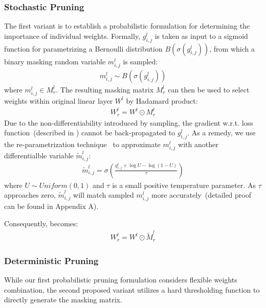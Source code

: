 \subsubsection{Stochastic Pruning}
\label{sec:stochastic}
The first variant is to establish a probabilistic formulation for determining the importance of individual weights. Formally, $g_{i,j}^l$ is taken as input to a sigmoid function for parametrizing a Bernoulli distribution $B(\sigma(g_{i,j}^l))$, from which a binary masking random variable $m_{i,j}^l$ is sampled:
\begin{align}
	m_{i,j}^l\sim B(\sigma(g_{i,j}^l))
	\label{eq:bernoulli}
\end{align}
where $m_{i,j}^l\in M_r^l$. The resulting masking matrix $M_{r}^{l}$ 
can then be used to select weights within original linear layer $W^l$ 
by Hadamard product:
\begin{align}
	W_r^l = W^l \odot M_r^l
	\label{eq:mask}
\end{align}
Due to the non-differentiability introduced by sampling, the gradient w.r.t. loss function~(described in ) cannot be back-propagated to $g_{i,j}^l$. As a remedy, we use the re-parametrization 
technique~\citep{Li2018} to approximate $m_{i,j}^l$ with another 
differentialble variable $\tilde{m}_{i,j}^l$:
\begin{align}
	\tilde{m}_{i,j}^l=\sigma(\frac{g_{i,j}^l+\log{U}-\log{(1-U)}}{\tau})
\end{align}
where $U\sim Uniform(0,1)$ and $\tau$ is a small positive temperature parameter. As $\tau$ approaches zero, $\tilde{m}_{i,j}^l$ will match sampled $m_{i,j}^l$ more accurately~(detailed proof can be found in Appendix A). 

Consequently,  becomes:
\begin{align}
	W_r^l = W^l \odot \tilde{M}_r^l
	\label{eq:soft}
\end{align}
\subsubsection{Deterministic Pruning}
\label{sec:deterministic}
While our first probabilistic pruning formulation considers flexible weights combination, the second proposed variant utilizes a hard thresholding function to directly generate the masking matrix.

